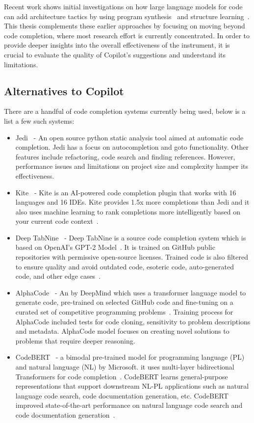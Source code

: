 Recent work shows initial investigations on how large language models for code can add architecture tactics by using program synthesis~\cite{Shokri2021} and structure learning~\cite{Karmakar2021}.
This thesis complements these earlier approaches by focusing on moving beyond code completion, where most research effort is currently concentrated.
In order to provide deeper insights into the overall effectiveness of the instrument, it is crucial to evaluate the quality of Copilot's suggestions and understand its limitations.

\subsection{Alternatives to Copilot}
There are a handful of code completion systems currently being used, below is a list a few such systems:

\begin{itemize}
    \item Jedi~\cite{jedi} - An open source python static analysis tool aimed at automatic code completion. Jedi has a focus on autocompletion and goto functionality. Other features include refactoring, code search and finding references. However, performance issues and limitations on project size and complexity hamper its effectiveness.
    \item Kite~\cite{kite} - Kite is an AI-powered code completion plugin that works with 16 languages and 16 IDEs. Kite provides 1.5x more completions than Jedi and it also uses machine learning to rank completions more intelligently based on your current code context~\cite{kite}.
    \item Deep TabNine~\cite{tabnine} - Deep TabNine is a source code completion system which is based on OpenAI's GPT-2 Model~\cite{gpt2}. It is trained on GitHub public repositories with permissive open-source licenses. Trained code is also filtered to ensure quality and avoid outdated code, esoteric code, auto-generated code, and other edge cases~\cite{tabnine}.
    \item AlphaCode~\cite{alphacode} - An \cct{} by DeepMind which uses a transformer language model to generate code, pre-trained on selected GitHub code and fine-tuning on a curated set of competitive programming problems~\cite{alphacode}. Training process for AlphaCode included tests for code cloning, sensitivity to problem descriptions and metadata. AlphaCode model focuses on creating novel solutions to problems that require deeper reasoning. 
    \item CodeBERT~\cite{codebert} - a bimodal pre-trained model for programming language (PL) and natural language (NL) by Microsoft. it uses multi-layer bidirectional Transformers for code completion~\cite{codebert}. CodeBERT learns general-purpose representations that support downstream NL-PL applications such as natural language code search, code documentation generation, etc. CodeBERT improved state-of-the-art performance on natural language code search and code documentation generation~\cite{codebert}.
\end{itemize}

